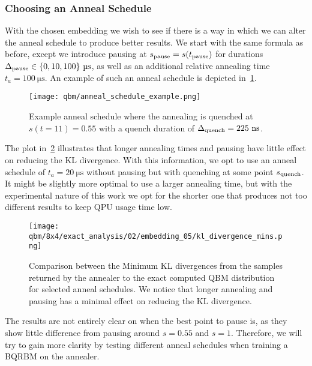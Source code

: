 \subsubsection{Choosing an Anneal Schedule}
With the chosen embedding we wish to see if there is a way in which we can alter the anneal schedule to produce better results.
We start with the same formula as before, except we introduce pausing at \( s_{\text{pause}} = s(t_{\text{pause}}) \) for durations \( \Deltapause \in \{ 0, 10, 100 \} \ \si{\micro\second} \), as well as an additional relative annealing time \( t_a = 100 \ \si{\micro\second} \).
An example of such an anneal schedule is depicted in~\cref{fig:anneal_schedule_example}.
\begin{figure}[!htb]
    \begin{center}
        \texttt{[image: qbm/anneal\_schedule\_example.png]}
    \end{center}
    \caption{Example anneal schedule where the annealing is quenched at \( s(t = 11) = 0.55 \) with a quench duration of \( \Delta_{\text{quench}} = 225 \ \si{\nano\second} \).}
    \label{fig:anneal_schedule_example}
\end{figure}

The plot in~\cref{fig:dkl_mins_embedding_05} illustrates that longer annealing times and pausing have little effect on reducing the KL divergence.
With this information, we opt to use an anneal schedule of \( t_a = 20 \ \si{\micro\second} \) without pausing but with quenching at some point \( s_{\text{quench}} \).
It might be slightly more optimal to use a larger annealing time, but with the experimental nature of this work we opt for the shorter one that produces not too different results to keep QPU usage time low.

\begin{figure}[!htb]
    \begin{center}
        \texttt{[image: qbm/8x4/exact\_analysis/02/embedding\_05/kl\_divergence\_mins.png]}
    \end{center}
    \caption{Comparison between the Minimum KL divergences from the samples returned by the annealer to the exact computed QBM distribution for selected anneal schedules. We notice that longer annealing and pausing has a minimal effect on reducing the KL divergence.}
    \label{fig:dkl_mins_embedding_05}
\end{figure}

The results are not entirely clear on when the best point to pause is, as they show little difference from pausing around \( s = 0.55 \) and \( s = 1 \).
Therefore, we will try to gain more clarity by testing different anneal schedules when training a BQRBM on the annealer.

